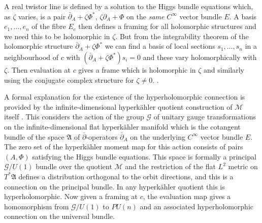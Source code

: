 A real twistor line is defined by  a  solution to the Higgs bundle equations which, as $\zeta$ varies,  is a pair $\bar\partial_A+\zeta\Phi^*$,  $\zeta\partial _A+ \Phi$ on the {\emph {same}} $C^{\infty}$ vector bundle $E$. A basis $e_1,\dots, e_n$ of the fibre $E_c$ then defines a framing for all holomorphic structures and we need this to be holomorphic in $\zeta$. But  from the integrability theorem of the holomorphic structure $\bar\partial_A+\zeta\Phi^*$ we can find a basis of local sections $s_1,\dots, s_n$ in a neighbourhood of $c$   with $(\bar\partial_A+\zeta\Phi^*)s_i=0$ and  these vary holomorphically with $\zeta$.
Then evaluation at $c$ gives a frame which is holomorphic in $\zeta$ and similarly using the conjugate complex structure for $\zeta\ne 0$. .




\begin{remark}
\notready

	A formal explanation for the  existence of the hyperholomorphic connection is provided by the infinite-dimensional hyperk\"ahler quotient construction of ${\mathcal M}$ itself \cite{hitchin}. This considers the action of the group ${\mathcal G}$ of unitary gauge transformations on the infinite-dimensional flat hyperk\"ahler manifold which is the cotangent bundle of the space ${\mathfrak A}$ of $\bar\partial$-operators $\bar\partial_A$ on the underlying $C^{\infty}$ vector bundle $E$. The zero set of the hyperk\"ahler moment map for this action consists of pairs $(A,\Phi)$ satisfying the Higgs bundle equations. This space is formally a principal ${\mathcal G}/U(1)$ bundle over the quotient ${\mathcal M}$ and the restriction of the flat $L^2$ metric on $T^*{\mathfrak A}$ defines a distribution orthogonal to the orbit directions, and this is a connection on the principal bundle. In any hyperk\"ahler quotient this is hyperholomorphic. Now given a framing at $c$, the evaluation map gives a homomorphism from ${\mathcal G}/U(1)$ to $PU(n)$ and an associated hyperholomorphic connection on the universal bundle.
\end{remark}










